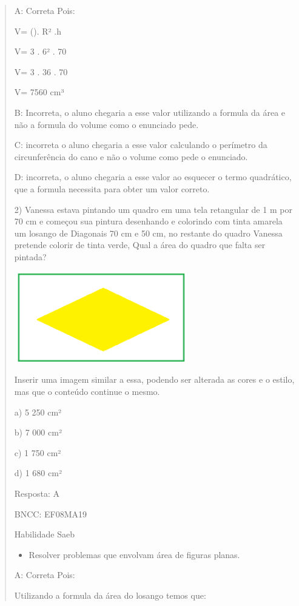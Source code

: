 \begin{quote}
\begin{escolha}
A: Correta Pois:

V= (\Pi). R² .h

V= 3 . 6² . 70

V= 3 . 36 . 70

V= 7560 cm³

B: Incorreta, o aluno chegaria a esse valor utilizando a formula da área
e não a formula do volume como o enunciado pede.

C: incorreta o aluno chegaria a esse valor calculando o perímetro da
circunferência do cano e não o volume como pede o enunciado.

D: incorreta, o aluno chegaria a esse valor ao esquecer o termo
quadrático, que a formula necessita para obter um valor correto.

2) Vanessa estava pintando um quadro em uma tela retangular de 1 m por
70 cm e começou sua pintura desenhando e colorindo com tinta amarela um
losango de Diagonais 70 cm e 50 cm, no restante do quadro Vanessa
pretende colorir de tinta verde, Qual a área do quadro que falta ser
pintada?

\includegraphics[width=2.95833in,height=1.56526in]{./imgSAEB_8_MAT/media/image54.png}

Inserir uma imagem similar a essa, podendo ser alterada as cores e o
estilo, mas que o conteúdo continue o mesmo.

a) 5 250 cm²

b) 7 000 cm²

c) 1 750 cm²

d) 1 680 cm²

Resposta: A

BNCC: EF08MA19

Habilidade Saeb

\begin{itemize}
\tightlist
\item
  Resolver problemas que envolvam área de figuras planas.
\end{itemize}

A: Correta Pois:

Utilizando a formula da área do losango temos que:


\end{escolha}
\end{quote}

